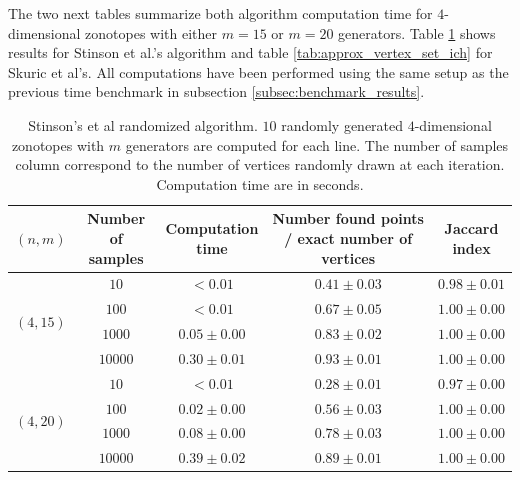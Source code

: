 The two next tables summarize both algorithm computation time for $4$-dimensional zonotopes with either $m=15$ or $m=20$ generators. Table \ref{tab:approx_vertex_set_stinson} shows results for Stinson et al.'s algorithm and table \ref{tab:approx_vertex_set_ich} for Skuric et al's. All computations have been performed using the same setup as the previous time benchmark in subsection \ref{subsec:benchmark_results}.
\begin{table}[!ht]
    \centering
    \begin{tabular}{|c|c|c|c|c|}
    \hline
    $(n,m)$ & \makecell{Number of \\ samples} & \makecell{Computation \\ time} & \makecell{Number found points \\ / exact number of vertices} & \makecell{Jaccard \\ index} \\
    \hline
    \hline

    \multirow{ 4}{*}{$(4,15)$} & $10$ & $<0.01$ & $0.41\pm 0.03$ & $0.98\pm 0.01$  \\
    \cline{2-5}
     & $100$ & $<0.01$ & $0.67\pm 0.05$ & $\mathbf{1.00\pm 0.00}$  \\
     \cline{2-5}
     & $1000$ & $0.05\pm 0.00$ & $0.83\pm 0.02$ & $\mathbf{1.00\pm 0.00}$ \\
    \cline{2-5}
     & $10000$ & $0.30\pm 0.01$ & $0.93\pm 0.01$ & $\mathbf{1.00\pm 0.00}$ \\
    \hline
    \multirow{ 4}{*}{$(4,20)$} & $10$ & $<0.01$ & $0.28\pm 0.01$ & $0.97\pm 0.00$ \\
    \cline{2-5}
     & $100$ & $0.02\pm 0.00$ & $0.56\pm 0.03$ & $\mathbf{1.00\pm 0.00}$ \\
    \cline{2-5}
     & $1000$ & $0.08\pm 0.00$ & $0.78\pm 0.03$ & $\mathbf{1.00\pm 0.00}$ \\
    \cline{2-5}
     & $10000$ & $0.39\pm 0.02$ & $0.89\pm 0.01$ & $\mathbf{1.00\pm 0.00}$ \\
    \hline
    \end{tabular}
    \caption{Stinson's et al randomized algorithm. $10$ randomly generated $4$-dimensional zonotopes with $m$ generators are computed for each line. The number of samples column correspond to the number of vertices randomly drawn at each iteration. Computation time are in seconds.}
    \label{tab:approx_vertex_set_stinson}
\end{table}

